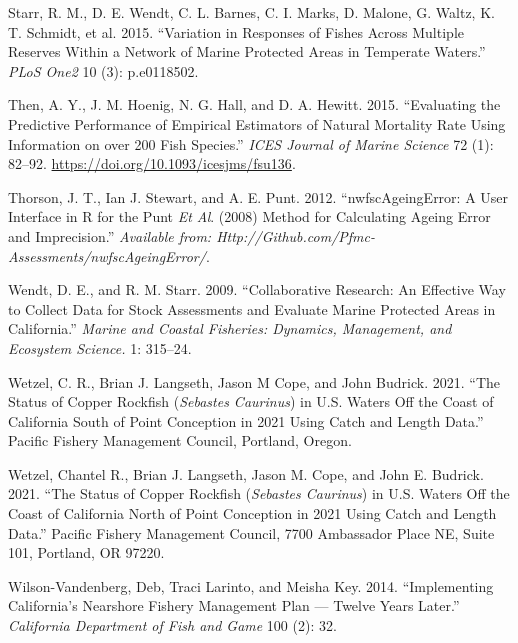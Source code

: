 \documentclass[11pt,
  english,
  letterpaper,
]{article}
\newlength{\cslhangindent}
\newenvironment{CSLReferences}[2] %
 {%
  \setlength{\parindent}{0pt}
  \ifodd #1 \everypar{\setlength{\hangindent}{\cslhangindent}}\ignorespaces\fi
  \ifnum #2 > 0
  \setlength{\parskip}{#2\baselineskip}
  \fi
 }%
 {}
\begin{document}
\begin{CSLReferences}{1}{0}
\leavevmode{}%
Starr, R. M., D. E. Wendt, C. L. Barnes, C. I. Marks, D. Malone, G. Waltz, K. T. Schmidt, et al. 2015. {``Variation in Responses of Fishes Across Multiple Reserves Within a Network of Marine Protected Areas in Temperate Waters.''} \emph{PLoS One2} 10 (3): p.e0118502.

\leavevmode{}%
Then, A. Y., J. M. Hoenig, N. G. Hall, and D. A. Hewitt. 2015. {``Evaluating the Predictive Performance of Empirical Estimators of Natural Mortality Rate Using Information on over 200 Fish Species.''} \emph{ICES Journal of Marine Science} 72 (1): 82--92. \url{https://doi.org/10.1093/icesjms/fsu136}.

\leavevmode{}%
Thorson, J. T., Ian J. Stewart, and A. E. Punt. 2012. {``{nwfscAgeingError}: A User Interface in {R} for the {P}unt \emph{Et Al}. (2008) Method for Calculating Ageing Error and Imprecision.''} \emph{Available from: Http://Github.com/Pfmc-Assessments/nwfscAgeingError/}.

\leavevmode{}%
Wendt, D. E., and R. M. Starr. 2009. {``Collaborative Research: An Effective Way to Collect Data for Stock Assessments and Evaluate Marine Protected Areas in {C}alifornia.''} \emph{Marine and Coastal Fisheries: Dynamics, Management, and Ecosystem Science.} 1: 315--24.

\leavevmode{}%
Wetzel, C. R., Brian J. Langseth, Jason M Cope, and John Budrick. 2021. {``The Status of Copper Rockfish (\emph{{Sebastes} Caurinus}) in {U}.{S}. Waters Off the Coast of {California} South of {Point} {Conception} in 2021 Using Catch and Length Data.''} Pacific Fishery Management Council, Portland, Oregon.

\leavevmode{}%
Wetzel, Chantel R., Brian J. Langseth, Jason M. Cope, and John E. Budrick. 2021. {``The Status of Copper Rockfish (\emph{{Sebastes} Caurinus}) in {U}.{S}. Waters Off the Coast of {California} North of {Point} {Conception} in 2021 Using Catch and Length Data.''} Pacific Fishery Management Council, 7700 Ambassador Place NE, Suite 101, Portland, OR 97220.

\leavevmode{}%
Wilson-Vandenberg, Deb, Traci Larinto, and Meisha Key. 2014. {``Implementing {California}'s {Nearshore} {Fishery} {Management} {Plan} --- Twelve Years Later.''} \emph{California Department of Fish and Game} 100 (2): 32.

\end{CSLReferences}
\end{document}
